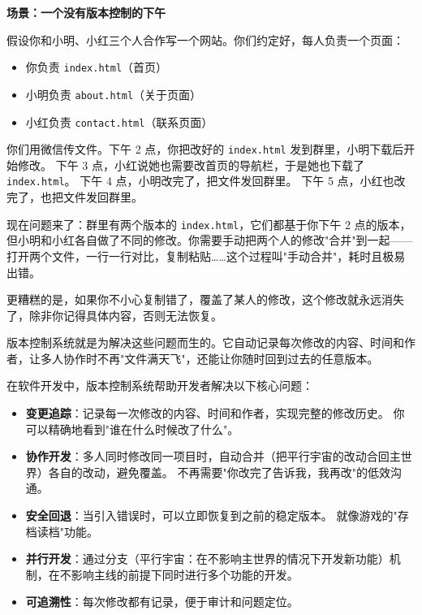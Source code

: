 \documentclass[12pt,a4paper,openany]{ctexbook}
\begin{document}
\begin{infobox}
\textbf{场景：一个没有版本控制的下午}

假设你和小明、小红三个人合作写一个网站。你们约定好，每人负责一个页面：
\begin{itemize}
  \item 你负责 \texttt{index.html}（首页）
  \item 小明负责 \texttt{about.html}（关于页面）
  \item 小红负责 \texttt{contact.html}（联系页面）
\end{itemize}

你们用微信传文件。下午 2 点，你把改好的 \texttt{index.html} 发到群里，小明下载后开始修改。
下午 3 点，小红说她也需要改首页的导航栏，于是她也下载了 \texttt{index.html}。
下午 4 点，小明改完了，把文件发回群里。
下午 5 点，小红也改完了，也把文件发回群里。

现在问题来了：群里有两个版本的 \texttt{index.html}，它们都基于你下午 2 点的版本，但小明和小红各自做了不同的修改。你需要手动把两个人的修改"合并"到一起——打开两个文件，一行一行对比，复制粘贴……这个过程叫"手动合并"，耗时且极易出错。

更糟糕的是，如果你不小心复制错了，覆盖了某人的修改，这个修改就永远消失了，除非你记得具体内容，否则无法恢复。

版本控制系统就是为解决这些问题而生的。它自动记录每次修改的内容、时间和作者，让多人协作时不再"文件满天飞"，还能让你随时回到过去的任意版本。
\end{infobox}

在软件开发中，版本控制系统帮助开发者解决以下核心问题：

\begin{itemize}[leftmargin=2em]
  \item \textbf{变更追踪}：记录每一次修改的内容、时间和作者，实现完整的修改历史。
        你可以精确地看到"谁在什么时候改了什么"。
  \item \textbf{协作开发}：多人同时修改同一项目时，自动合并（把平行宇宙的改动合回主世界）各自的改动，避免覆盖。
        不再需要"你改完了告诉我，我再改"的低效沟通。
  \item \textbf{安全回退}：当引入错误时，可以立即恢复到之前的稳定版本。
        就像游戏的"存档读档"功能。
  \item \textbf{并行开发}：通过分支（平行宇宙：在不影响主世界的情况下开发新功能）机制，在不影响主线的前提下同时进行多个功能的开发。
  \item \textbf{可追溯性}：每次修改都有记录，便于审计和问题定位。
\end{itemize}
\end{document}

